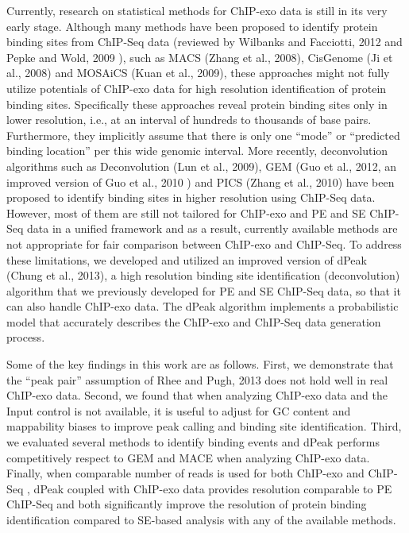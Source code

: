 \documentclass{bmcart}
\begin{document}
Currently, research on statistical methods for ChIP-exo data is still
in its very early stage. Although many methods have been proposed to
identify protein binding sites from ChIP-Seq data (reviewed by
Wilbanks and Facciotti, 2012\nocite{evaluation} and Pepke and Wold,
2009 \nocite{computation}), such as MACS (Zhang et al.,
2008\nocite{macs}), CisGenome (Ji et al., 2008\nocite{cisgenome}) and
MOSAiCS (Kuan et al., 2009\nocite{mosaics}), these approaches might
not fully utilize potentials of ChIP-exo data for high resolution
identification of protein binding sites. Specifically these approaches
reveal protein binding sites only in lower resolution, i.e., at an
interval of hundreds to thousands of base pairs. Furthermore, they
implicitly assume that there is only one ``mode'' or ``predicted
binding location'' per this wide genomic interval. More recently,
deconvolution algorithms such as Deconvolution (Lun et al.,
2009\cite{csdeconv}), GEM (Guo et al., 2012\nocite{gem}, an improved
version of Guo et al., 2010\nocite{gps} ) and PICS (Zhang et al.,
2010\nocite{pics}) have been proposed to identify binding sites in
higher resolution using ChIP-Seq data. However, most of them are still
not tailored for ChIP-exo and PE and SE ChIP-Seq data in a unified
framework and as a result, currently available methods are not
appropriate for fair comparison between ChIP-exo and ChIP-Seq. To
address these limitations, we developed and utilized an improved
version of dPeak (Chung et al., 2013\nocite{dpeak}), a high resolution
binding site identification (deconvolution) algorithm that we
previously developed for PE and SE ChIP-Seq data, so that it can also
handle ChIP-exo data. The dPeak algorithm implements a probabilistic
model that accurately describes the ChIP-exo and ChIP-Seq data
generation process.

Some of the key findings in this work are as follows. First, we
demonstrate that the ``peak pair'' assumption of Rhee and Pugh,
2013\nocite{exo2} does not hold well in real ChIP-exo data. Second, we
found that when analyzing ChIP-exo data and the Input control is not
available, it is useful to adjust for GC content and mappability
biases to improve peak calling and binding site identification. Third,
we evaluated several methods to identify binding events and dPeak
performs competitively respect to GEM and MACE when analyzing ChIP-exo
data. Finally, when comparable number of reads is used for both
ChIP-exo and ChIP-Seq , dPeak coupled with ChIP-exo data provides
resolution comparable to PE ChIP-Seq and both significantly improve
the resolution of protein binding identification compared to SE-based
analysis with any of the available methods.
\end{document}
